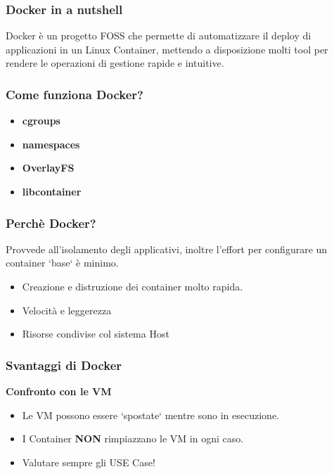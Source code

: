 \documentclass{beamer}
\begin{document}

\begin{frame}
    \frametitle{Docker in a nutshell}
    Docker \`e un progetto FOSS che permette di automatizzare il deploy di applicazioni in un Linux Container, mettendo a disposizione molti tool per rendere 
    le operazioni di gestione rapide e intuitive. 
\end{frame}


\begin{frame}
    \frametitle{Come funziona Docker?} 
    \begin{itemize}
        \item<1-> \textbf{cgroups}
        \item<2-> \textbf{namespaces}
        \item<3-> \textbf{OverlayFS}
        \item<4-> \textbf{libcontainer}
    \end{itemize}
\end{frame}


\begin{frame}
    \frametitle{Perch\`e Docker?}
    Provvede all'isolamento degli applicativi, inoltre l'effort per configurare un container `base` \`e minimo. 
    \begin{itemize}
        \item<1-> Creazione e distruzione dei container molto rapida. 
        \item<2-> Velocit\`a e leggerezza
        \item<3-> Risorse condivise col sistema Host
    \end{itemize}
\end{frame}


\begin{frame}
    \frametitle{Svantaggi di Docker}
    \begin{center}
        \textbf{Confronto con le VM}
    \end{center}
    \begin{itemize}
        \item<1-> Le VM possono essere `spostate` mentre sono in esecuzione. 
        \item<2-> I Container \textbf{NON} rimpiazzano le VM in ogni caso.
        \item<3-> Valutare sempre gli USE Case!
    \end{itemize}
\end{frame}
\end{document}

